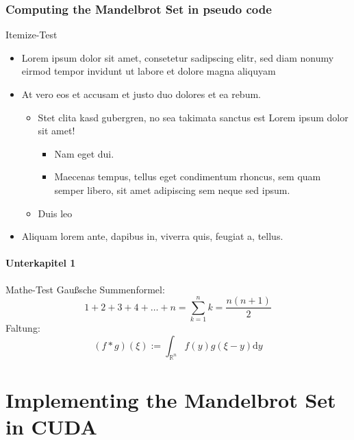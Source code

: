 \documentclass[fleqn,11pt,aspectratio=43]{beamer}
\begin{document}
\section{Computing the Mandelbrot Set in pseudo code}


\begin{frame}{Itemize-Test}
  \begin{itemize}
    \item Lorem ipsum dolor sit amet, consetetur sadipscing elitr, sed diam
      nonumy eirmod tempor invidunt ut labore et dolore magna aliquyam
    \item At vero eos et accusam et justo duo dolores et ea rebum.
      \begin{itemize}
        \item Stet clita kasd gubergren, no sea takimata sanctus est Lorem ipsum
          dolor sit amet!
          \begin{itemize}
            \item Nam eget dui.
            \item Maecenas tempus, tellus eget condimentum rhoncus, sem quam
              semper libero, sit amet adipiscing sem neque sed ipsum.
          \end{itemize}
        \item Duis leo
      \end{itemize}
    \item Aliquam lorem ante, dapibus in, viverra quis, feugiat a, tellus. 
  \end{itemize}
\end{frame}


\subsection{Unterkapitel 1}


\begin{frame}{Mathe-Test}
  Gaußsche Summenformel:
  \[1 + 2 + 3 + 4 + \ldots + n = \sum_{k=1}^n k = \frac{n(n+1)}{2}\]
  Faltung:
  \[(f*g)(\xi) := \int_{\mathbb{R}^n} f(y)g(\xi-y)\mathrm{d}y\]
\end{frame}


\part{Implementing the Mandelbrot Set in CUDA}


\begin{frame}
  \partpage
\end{frame}
\end{document}
